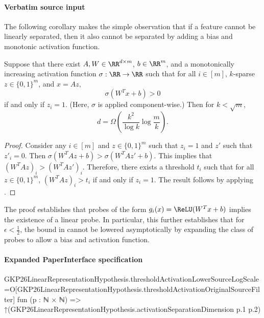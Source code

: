 \documentclass[10pt]{article}
\begin{document}
\paragraph{Verbatim source input}
\begin{ReviewVerbatim}
The following corollary makes the simple observation that if a feature cannot be linearly separated, then it also cannot be separated by adding a bias and monotonic activation function.

\begin{corollary}\label{cor:activation-bias}
    Suppose that there exist $A,W \in \RR^{d\times m}$, $b\in \RR^m$, and a monotonically increasing activation function $\sigma:\RR\rightarrow \RR$ such that for all $i\in [m]$, $k$-sparse $z\in \{0,1\}^m$, and $x=Az,$
    \begin{equation}\label{eq:coconut}
        \sigma(W^Tx + b) > 0
    \end{equation}
    if and only if $z_i=1.$ (Here, $\sigma$ is applied component-wise.) Then for $k < \sqrt{m}$,
    \begin{equation}
        d = \Omega\left(\frac{k^2}{\log k}\log\frac{m}{k}\right).
    \end{equation}
\end{corollary}
\begin{proof}
    Consider any $i\in [m]$ and $z\in \{0,1\}^m$ such that $z_i = 1$ and $z'$ such that $z'_i = 0.$ Then $\sigma(W^TAz + b) > \sigma(W^TAz' + b).$ This implies that $(W^TAz)_i > (W^TAz')_i.$ Therefore, there exists a threshold $t_i$ such that for all $z\in \{0,1\}^m$, $(W^TAz)_i > t_i$ if and only if $z_i = 1$. The result follows by applying .
\end{proof}

The proof establishes that probes of the form $g_i(x) = \ReLU(W^Tx + b)$ implies the existence of a linear probe. In particular, this further establishes that for $\epsilon < \frac{1}{2}$, the bound in  cannot be lowered asymptotically by expanding the class of probes to allow a bias and activation function.
\end{ReviewVerbatim}



\paragraph{Expanded PaperInterface specification}
\begin{ReviewVerbatim}
GKP26LinearRepresentationHypothesis.thresholdActivationLowerSourceLogScale =O[GKP26LinearRepresentationHypothesis.thresholdActivationOriginalSourceFilter]
  fun (p : ℕ × ℕ) => ↑(GKP26LinearRepresentationHypothesis.activationSeparationDimension p.1 p.2)
\end{ReviewVerbatim}
\end{document}
